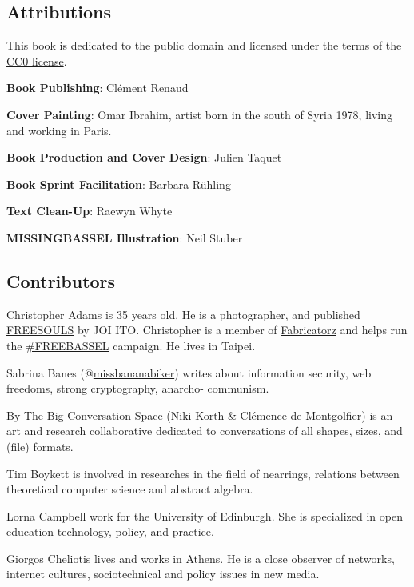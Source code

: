 \subsection{Attributions}\label{attributions}

This book is dedicated to the public domain and licensed under the terms
of the \href{license.html}{CC0 license}.

\textbf{Book Publishing}: Clément Renaud

\textbf{Cover Painting}: Omar Ibrahim, artist born in the south of Syria
1978, living and working in Paris.

\textbf{Book Production and Cover Design}: Julien Taquet

\textbf{Book Sprint Facilitation}: Barbara Rühling

\textbf{Text Clean-Up}: Raewyn Whyte

\textbf{MISSINGBASSEL Illustration}: Neil Stuber

\subsection{Contributors}\label{contributors}

\protect\hypertarget{christopher-adams}{}{}Christopher Adams is 35 years
old. He is a photographer, and published
\href{http://freesouls.cc}{FREESOULS} by JOI ITO. Christopher is a
member of \href{https://fabricatorz.com}{Fabricatorz} and helps run the
\href{http://freebassel.org}{\#FREEBASSEL} campaign. He lives in Taipei.

\protect\hypertarget{sabrina-banes}{}{}Sabrina Banes
(@\href{https://twitter.com/missbananabiker}{missbananabiker}) writes
about information security, web freedoms, strong cryptography, anarcho-
communism.

\protect\hypertarget{the-big-conversation-space}{}{}By The Big
Conversation Space (Niki Korth \& Clémence de Montgolfier) is an art and
research collaborative dedicated to conversations of all shapes, sizes,
and (file) formats.

\protect\hypertarget{tim-boykett}{}{}Tim Boykett is involved in
researches in the field of nearrings, relations between theoretical
computer science and abstract algebra.

\protect\hypertarget{lorna-campbell}{}{}Lorna Campbell work for the
University of Edinburgh. She is specialized in open education
technology, policy, and practice.

\protect\hypertarget{giorgos-cheliotis}{}{}Giorgos Cheliotis lives and
works in Athens. He is a close observer of networks, internet cultures,
sociotechnical and policy issues in new media.

